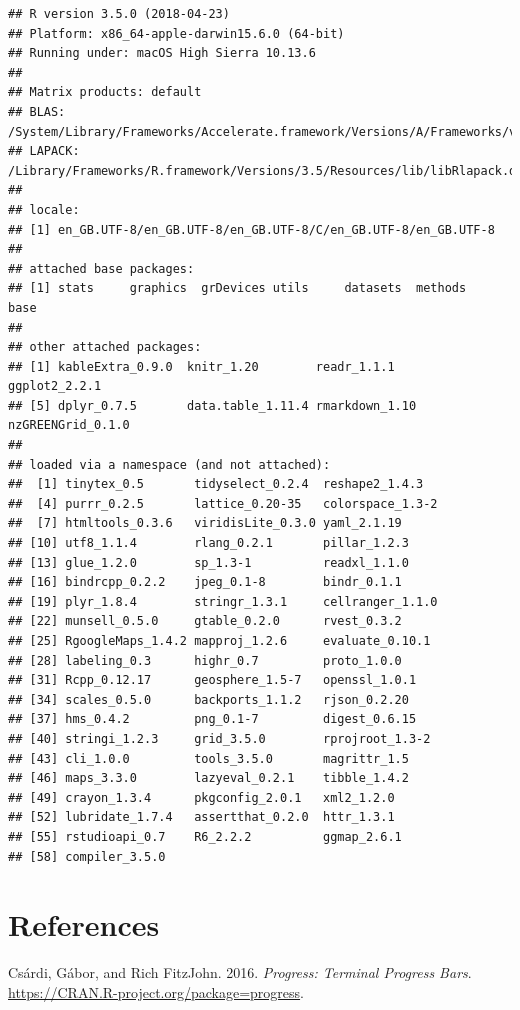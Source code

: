 \documentclass[]{article}
\begin{document}
\begin{verbatim}
## R version 3.5.0 (2018-04-23)
## Platform: x86_64-apple-darwin15.6.0 (64-bit)
## Running under: macOS High Sierra 10.13.6
## 
## Matrix products: default
## BLAS: /System/Library/Frameworks/Accelerate.framework/Versions/A/Frameworks/vecLib.framework/Versions/A/libBLAS.dylib
## LAPACK: /Library/Frameworks/R.framework/Versions/3.5/Resources/lib/libRlapack.dylib
## 
## locale:
## [1] en_GB.UTF-8/en_GB.UTF-8/en_GB.UTF-8/C/en_GB.UTF-8/en_GB.UTF-8
## 
## attached base packages:
## [1] stats     graphics  grDevices utils     datasets  methods   base     
## 
## other attached packages:
## [1] kableExtra_0.9.0  knitr_1.20        readr_1.1.1       ggplot2_2.2.1    
## [5] dplyr_0.7.5       data.table_1.11.4 rmarkdown_1.10    nzGREENGrid_0.1.0
## 
## loaded via a namespace (and not attached):
##  [1] tinytex_0.5       tidyselect_0.2.4  reshape2_1.4.3   
##  [4] purrr_0.2.5       lattice_0.20-35   colorspace_1.3-2 
##  [7] htmltools_0.3.6   viridisLite_0.3.0 yaml_2.1.19      
## [10] utf8_1.1.4        rlang_0.2.1       pillar_1.2.3     
## [13] glue_1.2.0        sp_1.3-1          readxl_1.1.0     
## [16] bindrcpp_0.2.2    jpeg_0.1-8        bindr_0.1.1      
## [19] plyr_1.8.4        stringr_1.3.1     cellranger_1.1.0 
## [22] munsell_0.5.0     gtable_0.2.0      rvest_0.3.2      
## [25] RgoogleMaps_1.4.2 mapproj_1.2.6     evaluate_0.10.1  
## [28] labeling_0.3      highr_0.7         proto_1.0.0      
## [31] Rcpp_0.12.17      geosphere_1.5-7   openssl_1.0.1    
## [34] scales_0.5.0      backports_1.1.2   rjson_0.2.20     
## [37] hms_0.4.2         png_0.1-7         digest_0.6.15    
## [40] stringi_1.2.3     grid_3.5.0        rprojroot_1.3-2  
## [43] cli_1.0.0         tools_3.5.0       magrittr_1.5     
## [46] maps_3.3.0        lazyeval_0.2.1    tibble_1.4.2     
## [49] crayon_1.3.4      pkgconfig_2.0.1   xml2_1.2.0       
## [52] lubridate_1.7.4   assertthat_0.2.0  httr_1.3.1       
## [55] rstudioapi_0.7    R6_2.2.2          ggmap_2.6.1      
## [58] compiler_3.5.0
\end{verbatim}

\section*{References}\label{references}

\hypertarget{refs}{}
\hypertarget{ref-progress}{}
Csárdi, Gábor, and Rich FitzJohn. 2016. \emph{Progress: Terminal
Progress Bars}. \url{https://CRAN.R-project.org/package=progress}.
\end{document}
